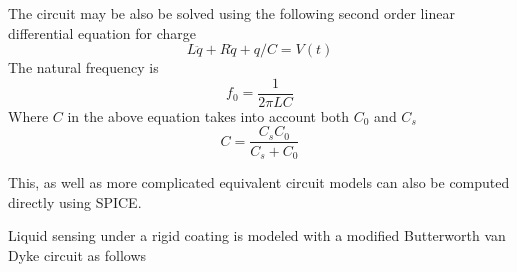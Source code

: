 The circuit may be also be solved using the following second order linear
differential equation for charge
\begin{equation}
  L\ddot{q}+R\dot{q}+q/C = V(t)
\end{equation}
The natural frequency is
\begin{equation}
  f_0 = \frac{1}{2 \pi L C}
\end{equation}
Where $C$ in the above equation takes into account both $C_0$ and $C_s$
\begin{equation}
  C = \frac{C_s C_0}{C_s + C_0}
\end{equation}

This, as well as more complicated equivalent circuit models can also be
computed directly using SPICE.

Liquid sensing under a rigid coating is modeled with a modified Butterworth
van Dyke circuit as follows

\begin{center}
\end{center}



